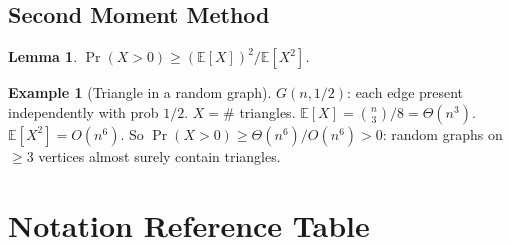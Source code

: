 \documentclass[12pt]{article}
\newtheorem{lemma}[theorem]{Lemma}
\theoremstyle{definition}
\newtheorem{example}[theorem]{Example}
\theoremstyle{remark}
\begin{document}
\subsection{Second Moment Method}

\begin{lemma}
$\Pr(X > 0) \ge (\mathbb{E}[X])^2 / \mathbb{E}[X^2]$.
\end{lemma}

\begin{example}[Triangle in a random graph]
$G(n, 1/2)$: each edge present independently with prob $1/2$.
$X = \#$ triangles.  $\mathbb{E}[X] = \binom{n}{3}/8 = \Theta(n^3)$.
$\mathbb{E}[X^2] = O(n^6)$.  So $\Pr(X>0) \ge \Theta(n^6)/O(n^6) > 0$:
random graphs on $\ge 3$ vertices almost surely contain triangles.
\end{example}

\section{Notation Reference Table}
\end{document}
